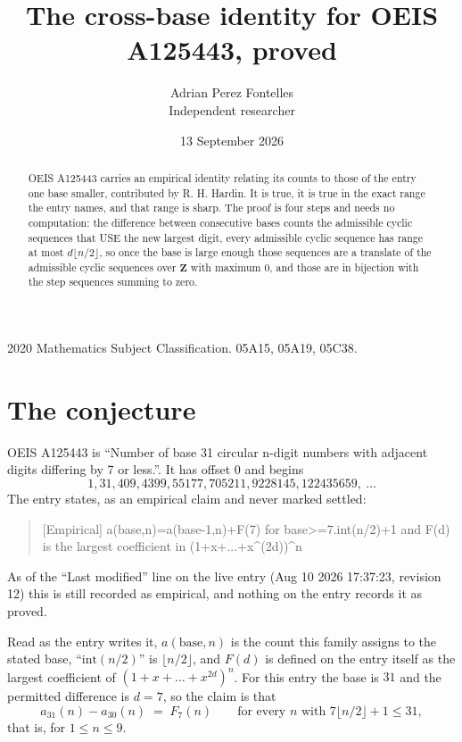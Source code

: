 \documentclass[11pt,a4paper]{article}
\title{The cross-base identity for OEIS A125443, proved}
\author{Adrian Perez Fontelles\\ \small Independent researcher}
\date{13 September 2026}
\theoremstyle{plain}
\theoremstyle{definition}
\begin{document}
\maketitle

\begin{abstract}
OEIS A125443 carries an empirical identity relating its counts to those of the entry one base
smaller, contributed by R. H. Hardin. It is true, it is true in the exact range the entry
names, and that range is sharp. The proof is four steps and needs no computation: the
difference between consecutive bases counts the admissible cyclic sequences that USE the new
largest digit, every admissible cyclic sequence has range at most $d\lfloor n/2\rfloor$, so
once the base is large enough those sequences are a translate of the admissible cyclic
sequences over $\mathbf{Z}$ with maximum $0$, and those are in bijection with the step
sequences summing to zero.
\end{abstract}

\noindent\small 2020 Mathematics Subject Classification. 05A15, 05A19, 05C38.\normalsize

\section{The conjecture}

OEIS A125443 is ``Number of base 31 circular n-digit numbers with adjacent digits differing by 7 or less.''. It has offset $0$ and begins
\[
1, 31, 409, 4399, 55177, 705211, 9228145, 122435659,\ \dots
\]
The entry states, as an empirical claim and never marked settled:
\begin{quote}
[Empirical] a(base,n)=a(base-1,n)+F(7) for base>=7.int(n/2)+1 and F(d) is the largest coefficient in (1+x+...+x\^{}(2d))\^{}n
\end{quote}
As of the ``Last modified'' line on the live entry (Aug 10 2026 17:37:23, revision 12)
this is still recorded as empirical, and nothing on the entry records it as proved.

Read as the entry writes it, $a(\mathrm{base},n)$ is the count this family assigns to the
stated base, ``$\mathrm{int}(n/2)$'' is $\lfloor n/2\rfloor$, and $F(d)$ is defined on the
entry itself as the largest coefficient of $(1+x+\dots+x^{2d})^{n}$. For this entry
the base is $31$ and the permitted difference is $d=7$, so the claim is that
\[
a_{31}(n)-a_{30}(n)\;=\;F_{7}(n)
\qquad\text{for every } n \text{ with } 7\lfloor n/2\rfloor+1\le31,
\]
that is, for $1\le n\le9$.
\end{document}
